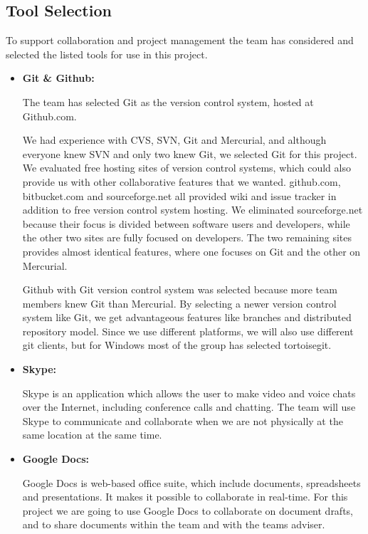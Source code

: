 \subsection{Tool Selection}
To support collaboration and project management the team has considered and selected the listed tools for use in this project.

\begin{itemize}
\item \textbf{Git \& Github:} 

The team has selected Git as the version control system, hosted at Github.com.

We had experience with CVS, SVN, Git and Mercurial, and although everyone knew SVN and only two knew Git, we selected Git for this project. We evaluated free hosting sites of version control systems, which could also provide us with other collaborative features that we wanted. github.com, bitbucket.com and sourceforge.net all provided wiki and issue tracker in addition to free version control system hosting. We eliminated sourceforge.net because their focus is divided between software users and developers, while the other two sites are fully focused on developers. The two remaining sites provides almost identical features, where one focuses on Git and the other on Mercurial.

Github with Git version control system was selected because more team members knew Git than Mercurial. By selecting a newer version control system like Git, we get advantageous features like branches and distributed repository model. Since we use different platforms, we will also use different git clients, but for Windows most of the group has selected tortoisegit.

\item \textbf{Skype:} 

Skype is an application which allows the user to make video and voice chats over the Internet, including conference calls and chatting. The team will use Skype to communicate and collaborate when we are not physically at the same location at the same time.

\item \textbf{Google Docs:} 

Google Docs is web-based office suite, which include documents, spreadsheets and presentations. It makes it possible to collaborate in real-time. For this project we are going to use Google Docs to collaborate on document drafts, and to share documents within the team and with the teams adviser.


\end{itemize}
